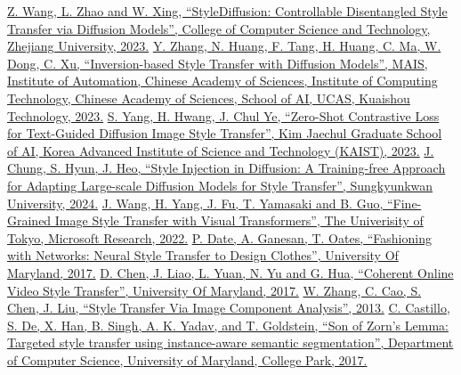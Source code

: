 \documentclass{article}
\begin{document}
% 
% 


\renewcommand{\bibname}{References}
\addcontentsline{toc}{section}{\bibname}

\begin{thebibliography}{9} 
    \href{https://arxiv.org/pdf/2308.07863}{Z. Wang, L. Zhao and W. Xing, “StyleDiffusion: Controllable Disentangled Style Transfer via Diffusion Models”, College of Computer Science and Technology, Zhejiang University, 2023.}
     \href{https://openaccess.thecvf.com/content/CVPR2023/papers/Zhang_Inversion-Based_Style_Transfer_With_Diffusion_Models_CVPR_2023_paper.pdf}{Y. Zhang, N. Huang, F. Tang, H. Huang, C. Ma, W. Dong, C. Xu, “Inversion-based Style Transfer with Diffusion Models”, MAIS, Institute of Automation, Chinese Academy of Sciences, Institute of Computing Technology, Chinese Academy of Sciences, School of AI, UCAS, Kuaishou Technology, 2023.}
     \href{https://openaccess.thecvf.com/content/ICCV2023/papers/Yang_Zero-Shot_Contrastive_Loss_for_Text-Guided_Diffusion_Image_Style_Transfer_ICCV_2023_paper.pdf}{S. Yang, H. Hwang, J. Chul Ye, “Zero-Shot Contrastive Loss for Text-Guided Diffusion Image Style Transfer”, Kim Jaechul Graduate School of AI, Korea Advanced Institute of Science and Technology (KAIST), 2023.}
    \href{https://arxiv.org/pdf/2312.09008}{J. Chung, S. Hyun, J. Heo, “Style Injection in Diffusion: A Training-free Approach
    for Adapting Large-scale Diffusion Models for Style Transfer”, Sungkyunkwan University, 2024.}
    \href{https://arxiv.org/pdf/2210.05176v1}{J. Wang, H. Yang, J. Fu, T. Yamasaki and B. Guo, “Fine-Grained Image Style Transfer
    with Visual Transformers”,  The Univerisity of Tokyo, Microsoft Research, 2022.}
    \href{https://arxiv.org/pdf/1707.09899}{P. Date, A. Ganesan, T. Oates, “Fashioning with Networks: Neural Style Transfer to Design
    Clothes”,  University Of Maryland, 2017.}
    \href{https://arxiv.org/pdf/1703.09211}{D. Chen, J. Liao, L. Yuan, N. Yu and G. Hua, “Coherent Online Video Style Transfer”,  University Of Maryland, 2017.}
     \href{https://www.researchgate.net/publication/234096926_Style_Transfer_Via_Im  age_Component_Analysis}{W. Zhang, C. Cao, S. Chen, J. Liu, “Style Transfer Via Image Component Analysis”,  2013.}
    \href{https://arxiv.org/pdf/1701.02357}{C. Castillo, S. De, X. Han, B. Singh, A. K. Yadav, and T. Goldstein, “Son of Zorn’s Lemma: Targeted style transfer using instance-aware semantic segmentation”, Department of Computer Science, University of Maryland, College Park, 2017.}

\end{thebibliography}
\end{document}
